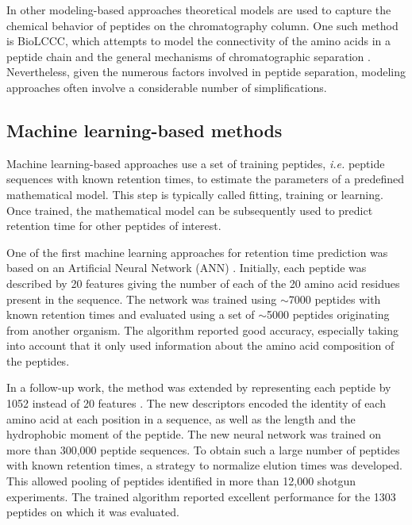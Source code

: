 \documentclass[a4paper]{article}
\begin{document}
In other modeling-based approaches theoretical models are used to
capture the chemical behavior of peptides on the chromatography
column. One such method is BioLCCC, which attempts to model the
connectivity of the amino acids in a peptide chain and the general
mechanisms of chromatographic
separation \cite{gorshkov2006}. Nevertheless, given the numerous
factors involved in peptide separation, modeling approaches often
involve a considerable number of simplifications.
 
\subsection{Machine learning-based methods}
\label{sec:ML}

Machine learning-based approaches use a set of training peptides, {\em
  i.e.} peptide sequences with known retention times, to estimate the
parameters of a predefined mathematical model. This step is typically
called fitting, training or learning. Once trained, the mathematical
model can be subsequently used to predict retention time for other
peptides of interest.


One of the first machine learning approaches for retention time
prediction was based on an Artificial Neural Network
(ANN) \cite{petritis2003}. Initially, each peptide was described by 20
features giving the number of each of the 20 amino acid residues
present in the sequence. The network was trained using $\sim$7000
peptides with known retention times and evaluated using a set of
$\sim$5000 peptides originating from another organism. The algorithm
reported good accuracy, especially taking into account that it only
used information about the amino acid composition of the peptides.



In a follow-up work, the method was extended by representing each
peptide by 1052 instead of 20 features
\cite{petritis2006improved}. The new descriptors encoded the identity
of each amino acid at each position in a sequence, as well as the
length and the hydrophobic moment of the peptide. The new neural
network was trained on more than 300,000 peptide sequences. To obtain
such a large number of peptides with known retention times, a strategy
to normalize elution times was developed. This allowed pooling of
peptides identified in more than 12,000 shotgun experiments. The
trained algorithm reported excellent performance for the 1303 peptides
on which it was evaluated.
\end{document}
